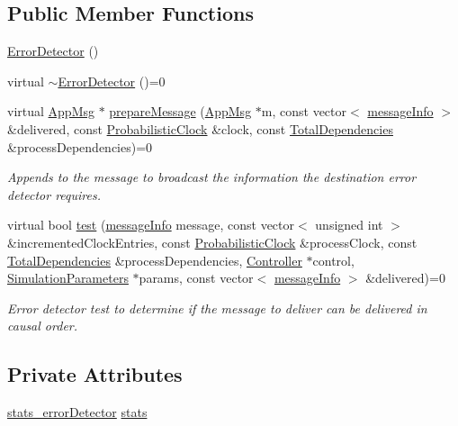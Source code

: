 \subsection*{Public Member Functions}
\begin{DoxyCompactItemize}
\item 
\hyperlink{class_error_detector_ae851a02dff242968cd6419400271d74f}{Error\+Detector} ()
\item 
virtual \hyperlink{class_error_detector_a3708d713f8f7bee01aa7e5a2fb7bb652}{$\sim$\+Error\+Detector} ()=0
\item 
virtual \hyperlink{class_app_msg}{App\+Msg} $\ast$ \hyperlink{class_error_detector_a8cac1f6ac6803da4379df7891789c490}{prepare\+Message} (\hyperlink{class_app_msg}{App\+Msg} $\ast$m, const vector$<$ \hyperlink{structures_8h_a7e7bdc1d2fff8a9436f2f352b2711ed6}{message\+Info} $>$ \&delivered, const \hyperlink{class_probabilistic_clock}{Probabilistic\+Clock} \&clock, const \hyperlink{class_total_dependencies}{Total\+Dependencies} \&process\+Dependencies)=0
\begin{DoxyCompactList}\small\item\em Appends to the message to broadcast the information the destination error detector requires. \end{DoxyCompactList}\item 
virtual bool \hyperlink{class_error_detector_afc717d04768dd207196c08e24163115c}{test} (\hyperlink{structures_8h_a7e7bdc1d2fff8a9436f2f352b2711ed6}{message\+Info} message, const vector$<$ unsigned int $>$ \&incremented\+Clock\+Entries, const \hyperlink{class_probabilistic_clock}{Probabilistic\+Clock} \&process\+Clock, const \hyperlink{class_total_dependencies}{Total\+Dependencies} \&process\+Dependencies, \hyperlink{class_controller}{Controller} $\ast$control, \hyperlink{class_simulation_parameters}{Simulation\+Parameters} $\ast$params, const vector$<$ \hyperlink{structures_8h_a7e7bdc1d2fff8a9436f2f352b2711ed6}{message\+Info} $>$ \&delivered)=0
\begin{DoxyCompactList}\small\item\em Error detector test to determine if the message to deliver can be delivered in causal order. \end{DoxyCompactList}\end{DoxyCompactItemize}
\subsection*{Private Attributes}
\begin{DoxyCompactItemize}
\item 
\hyperlink{_error_detector_8h_abbc922e22c7b55f0bd58bea618eec587}{stats\+\_\+error\+Detector} \hyperlink{class_error_detector_acb550f19c1da2d61d40757351f96d4b1}{stats}
\end{DoxyCompactItemize}
